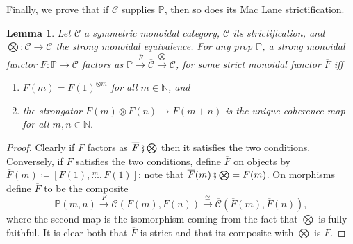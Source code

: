 \documentclass[11pt, oneside, article]{memoir}
\theoremstyle{plain}
\newtheorem{lemma}[theorem]{Lemma}
\theoremstyle{definition}
\theoremstyle{remark}
\newcommand{\cat}[1]{\mathcal{#1}}%
\newcommand{\tpow}[1]{^{\otimes #1}}
\newcommand{\strict}[1]{\overline{#1}}
\newcommand{\nn}{\mathbb{N}}
\newcommand{\pp}{\mathbb{P}}
\newcommand{\Ldots}[1]{\overset{#1}{\ldots}}
\newcommand{\cp}{\mathbin{\fatsemi}}
\newcommand{\To}[1]{\xrightarrow{#1}}
\begin{document}
Finally, we prove that if $\cat{C}$ supplies $\pp$, then so does its Mac Lane strictification.

\begin{lemma}\label{lemma.strictification}
Let $\cat{C}$ a symmetric monoidal category, $\strict{\cat{C}}$ its strictification, and $\bigotimes\colon\strict{\cat{C}}\to\cat{C}$ the strong monoidal equivalence. For any prop $\pp$, a strong monoidal functor $F\colon\pp\to\cat{C}$ factors as $\pp\To{\strict{F}}\strict{\cat{C}}\To{\bigotimes}\cat{C}$, for some strict monoidal functor $\strict{F}$ iff
\begin{enumerate}[label=(\roman*)]
	\item $F(m)=F(1)\tpow{m}$ for all $m\in\nn$, and
	\item the strongator $F(m)\otimes F(n)\to F(m+n)$ is the unique coherence map for all $m,n \in \nn$.
\end{enumerate}
\end{lemma}
\begin{proof}
Clearly if $F$ factors as $\strict{F}\cp\bigotimes$ then it satisfies the two conditions. Conversely, if $F$ satisfies the two conditions, define $\strict{F}$ on objects by $\strict{F}(m)\coloneqq[F(1),\Ldots{m},F(1)]$; note that $\strict{F}(m)\cp\bigotimes=F(m)$. On morphisms define $\strict{F}$ to be the composite
\[\pp(m,n)\To{F}\cat{C}(F(m),F(n))\To{\cong}\strict{\cat{C}}(\strict{F}(m),\strict{F}(n)),\]
where the second map is the isomorphism coming from the fact that $\bigotimes$ is fully faithful. It is clear both that $\strict{F}$ is strict and that its composite with $\bigotimes$ is $F$.
\end{proof}
\end{document}
